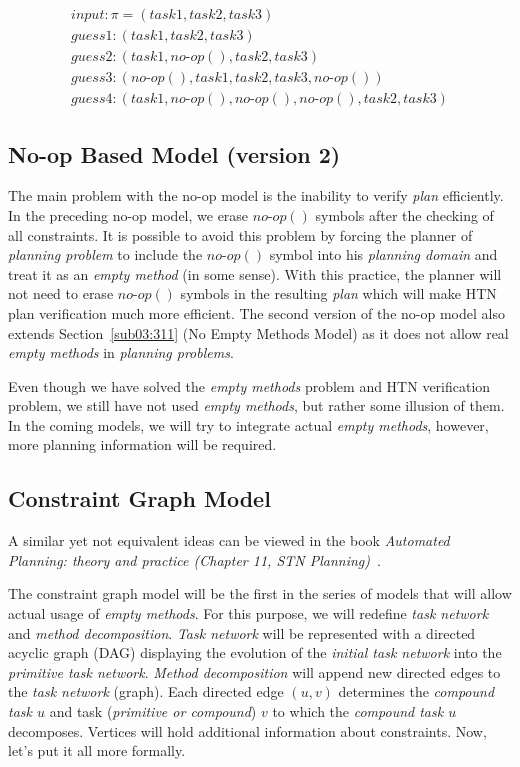 \begin{gather*}
    input: \pi = (task1, task2, task3) \\
    guess 1: (task1, task2, task3) \\
    guess 2: (task1, no\text{-}op(), task2, task3) \\
    guess 3: (no\text{-}op(), task1, task2, task3, no\text{-}op()) \\
    guess 4: (task1, no\text{-}op(), no\text{-}op(), no\text{-}op(), task2, task3)
\end{gather*}

\subsection{No-op Based Model (version 2)}

\medskip\noindent
The main problem with the no-op model is the inability to verify \emph{plan} efficiently. In the preceding no-op model, we erase $no\text{-}op()$ symbols after the checking of all constraints. It is possible to avoid this problem by forcing the planner of \emph{planning problem} to include the $no\text{-}op()$ symbol into his \emph{planning domain} and treat it as an \emph{empty method} (in some sense). With this practice, the planner will not need to erase $no\text{-}op()$ symbols in the resulting \emph{plan} which will make HTN plan verification much more efficient. The second version of the no-op model also extends Section~\ref{sub03:311} (No Empty Methods Model) as it does not allow real \emph{empty methods} in \emph{planning problems}.

\medskip\noindent
Even though we have solved the \emph{empty methods} problem and HTN verification problem, we still have not used \emph{empty methods}, but rather some illusion of them. In the coming models, we will try to integrate actual \emph{empty methods}, however, more planning information will be required.

\subsection{Constraint Graph Model}

\medskip\noindent
A similar yet not equivalent ideas can be viewed in the book \emph{Automated Planning: theory and practice (Chapter 11, STN Planning)}~\cite{nau}.

\medskip\noindent
The constraint graph model will be the first in the series of models that will allow actual usage of \emph{empty methods}. For this purpose, we will redefine \emph{task network} and \emph{method decomposition}. \emph{Task network} will be represented with a directed acyclic graph (DAG) displaying the evolution of the \emph{initial task network} into the \emph{primitive task network}. \emph{Method decomposition} will append new directed edges to the \emph{task network} (graph). Each directed edge $(u,v)$ determines the \emph{compound task $u$} and task (\emph{primitive or compound}) $v$ to which the \emph{compound task $u$} decomposes. Vertices will hold additional information about constraints. Now, let's put it all more formally.

